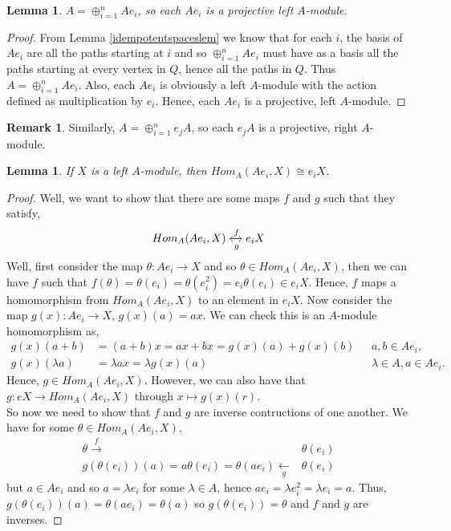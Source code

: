 \documentclass[11.5pt, twoside, a4paper, titlepage]{report}
\providecommand{\equ}[0]{\begin{equation*}}
\providecommand{\eequ}[0] {\end{equation*}}
\theoremstyle{definition}
\newtheorem{rem}[mydef]{Remark}
\theoremstyle{plain}
\newtheorem{lem}[mydef]{Lemma}
\begin{document}
\begin{lem}
$A=\oplus^n_{i=1}Ae_i$, so each $Ae_i$ is a projective left $A$-module.
\end{lem}
\begin{proof}
From Lemma \ref{idempotentspaceslem} we know that for each $i$, the basis of $Ae_i$ are all the paths starting at $i$ and so $\oplus^n_{i=1}Ae_i$ must have as a basis all the paths starting at every vertex in $Q$, hence all the paths in $Q$. Thus $A=\oplus^n_{i=1}Ae_i$. Also, each $Ae_i$ is obviously a left $A$-module with the action defined as multiplication by $e_i$. Hence, each $Ae_i$ is a projective, left $A$-module.
\end{proof}

\begin{rem}
Similarly, $A=\oplus_{i=1}^ne_jA$, so each $e_jA$ is a projective, right $A$-module.
\end{rem}

\begin{lem} \label{idempotenthomlem}
If $X$ is a left $A$-module, then $Hom_A(Ae_i,X)\cong e_iX$.
\end{lem}
\begin{proof}
Well, we want to show that there are some maps $f$ and $g$ such that they satisfy,
\equ
Hom_A(Ae_i, X) \xleftrightarrow[g]{f}e_iX
\eequ
Well, first consider the map $\theta: Ae_i \to X$ and so $\theta \in Hom_A(Ae_i, X)$, then we can have $f$ such that $f(\theta)=\theta(e_i)=\theta(e_i^2)=e_i\theta(e_i)\in e_iX$. Hence, $f$ maps a homomorphism from $Hom_A(Ae_i, X)$ to an element in $e_iX$.  Now consider the map $g(x): Ae_i \to X$, $g(x)(a)=ax$. We can check this is an $A$-module homomorphism as, 
\begin{align*}
g(x)(a+b) &=(a+b)x=ax+bx=g(x)(a)+g(x)(b)\text{ } & a, b\in Ae_i,\\
g(x)(\lambda a) &=\lambda a x=\lambda g(x)(a) \text{ } & \lambda\in A, a \in Ae_i.
\end{align*}
Hence, $g \in Hom_A(Ae_i, X)$. However, we can also have that $g: eX \to Hom_A(Ae_i, X)$ through $x \mapsto g(x)(r)$. \\
So now we need to show that $f$ and $g$ are inverse contructions of one another. We have for some $\theta \in Hom_A(Ae_i, X)$, 
\begin{align*}
\theta \xrightarrow{f} & \theta(e_i)\\
g(\theta(e_i))(a)=a\theta(e_i)=\theta(ae_i) \xleftarrow[g]{} & \theta(e_i)
\end{align*}
but $a\in Ae_i$ and so $a=\lambda e_i$ for some $\lambda\in A$, hence $ae_i=\lambda e_i^2=\lambda e_i=a$. Thus, $g(\theta(e_i))(a)=\theta(ae_i)=\theta(a)$ so $g(\theta(e_i))=\theta$ and $f$ and $g$ are inverses.
\end{proof}
\end{document}

